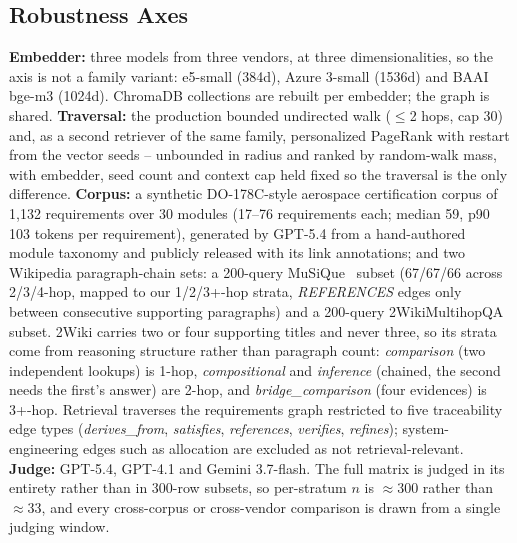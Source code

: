 \subsection{Robustness Axes}
\label{sec:axes}
\textbf{Embedder:} three models from three vendors, at three
dimensionalities, so the axis is not a family variant: e5-small
(384d), Azure 3-small (1536d) and BAAI bge-m3 (1024d). ChromaDB
collections are rebuilt per embedder; the graph is shared. \textbf{Traversal:} the production bounded
undirected walk ($\leq$2 hops, cap 30) and, as a second retriever of
the same family, personalized PageRank with restart from the vector
seeds -- unbounded in radius and ranked by random-walk mass, with
embedder, seed count and context cap held fixed so the traversal is the
only difference. \textbf{Corpus:} a synthetic DO-178C-style
aerospace certification corpus of 1{,}132 requirements over 30 modules
(17--76 requirements each; median 59, p90 103 tokens per requirement),
generated by GPT-5.4 from a hand-authored module taxonomy and publicly
released with its link annotations; and two Wikipedia
paragraph-chain sets: a 200-query MuSiQue~\cite{musique2022} subset
(67/67/66 across 2/3/4-hop, mapped to our 1/2/3+-hop strata,
\textit{REFERENCES} edges only between consecutive supporting
paragraphs) and a 200-query 2WikiMultihopQA~\cite{twowiki2020} subset.
2Wiki carries two or four supporting titles and never three, so its
strata come from reasoning structure rather than paragraph count:
\textit{comparison} (two independent lookups) is 1-hop,
\textit{compositional} and \textit{inference} (chained, the second
needs the first's answer) are 2-hop, and \textit{bridge\_comparison}
(four evidences) is 3+-hop. Retrieval traverses the requirements graph
restricted to five traceability edge types (\textit{derives\_from},
\textit{satisfies}, \textit{references}, \textit{verifies},
\textit{refines}); system-engineering edges such as allocation are
excluded as not retrieval-relevant. \textbf{Judge:} GPT-5.4, GPT-4.1 and Gemini 3.7-flash. The full
matrix is judged in its entirety rather than in 300-row subsets, so
per-stratum $n$ is $\approx$300 rather than $\approx$33, and every
cross-corpus or cross-vendor comparison is drawn from a single judging
window.

